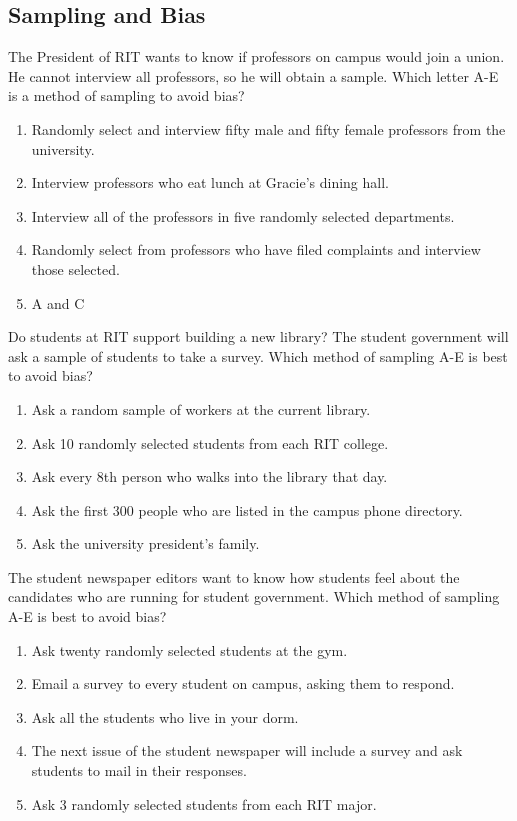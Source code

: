 \documentclass[11.5pt]{sig-alternate} %
\begin{document}
\begin{large}
\subsection*{Sampling and Bias}

The President of RIT wants to know if professors on campus would join a union. He cannot interview all professors, so he will obtain a sample. Which letter A-E is a method of sampling to avoid bias?
\begin{enumerate}[label=\Alph*.]
    \item Randomly select and interview fifty male and fifty female professors from the university.
    \item Interview professors who eat lunch at Gracie’s dining hall.
    \item Interview all of the professors in five randomly selected departments.
    \item Randomly select from professors who have filed complaints and interview those selected.
    \item A and C
\end{enumerate}

Do students at RIT support building a new library? The student government will ask a sample of students to take a survey. Which method of sampling A-E is best to avoid bias?
\begin{enumerate}[label=\Alph*.]
    \item Ask a random sample of workers at the current library.
    \item Ask 10 randomly selected students from each RIT college.
    \item Ask every 8th person who walks into the library that day.
    \item Ask the first 300 people who are listed in the campus phone directory.
    \item Ask the university president’s family.
\end{enumerate}

The student newspaper editors want to know how students feel about the candidates who are running for student government. Which method of sampling A-E is best to avoid bias?
\begin{enumerate}[label=\Alph*.]
    \item Ask twenty randomly selected students at the gym.
    \item Email a survey to every student on campus, asking them to respond.
    \item Ask all the students who live in your dorm.
    \item The next issue of the student newspaper will include a survey and ask students to mail in their responses.
    \item Ask 3 randomly selected students from each RIT major.
\end{enumerate}


\end{large}
\end{document}

